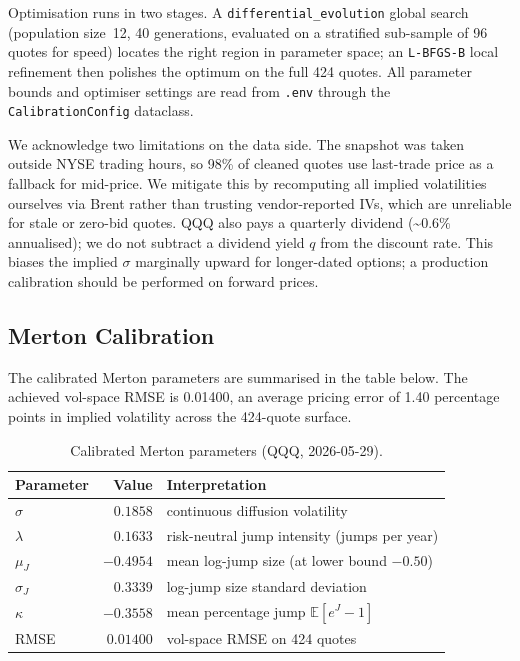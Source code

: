 \documentclass[12pt]{article}
\begin{document}
Optimisation runs in two stages. A \texttt{differential\_evolution}
global search (population size~12, 40 generations, evaluated on a
stratified sub-sample of 96 quotes for speed) locates the right region
in parameter space; an \texttt{L-BFGS-B} local refinement then polishes
the optimum on the full 424 quotes. All parameter bounds and optimiser
settings are read from \texttt{.env} through the
\texttt{CalibrationConfig} dataclass.

We acknowledge two limitations on the data side. The snapshot was taken
outside NYSE trading hours, so 98\% of cleaned quotes use last-trade
price as a fallback for mid-price. We mitigate this by recomputing all
implied volatilities ourselves via Brent rather than trusting
vendor-reported IVs, which are unreliable for stale or zero-bid quotes.
QQQ also pays a quarterly dividend (\textasciitilde$0.6\%$ annualised);
we do not subtract a dividend yield $q$ from the discount rate. This
biases the implied $\sigma$ marginally upward for longer-dated options;
a production calibration should be performed on forward prices.


\subsection*{Merton Calibration}

The calibrated Merton parameters are summarised in the table below.
The achieved vol-space RMSE is 0.01400, an average pricing error of
1.40 percentage points in implied volatility across the 424-quote
surface.

\begin{table}[H]
\centering
\caption{Calibrated Merton parameters (QQQ, 2026-05-29).}
\begin{tabular}{lrl}
\toprule
Parameter      & Value     & Interpretation \\
\midrule
$\sigma$       & $0.1858$  & continuous diffusion volatility \\
$\lambda$      & $0.1633$  & risk-neutral jump intensity (jumps per year) \\
$\mu_J$        & $-0.4954$ & mean log-jump size (at lower bound $-0.50$) \\
$\sigma_J$     & $0.3339$  & log-jump size standard deviation \\
$\kappa$       & $-0.3558$ & mean percentage jump $\mathbb{E}[e^J - 1]$ \\
RMSE           & $0.01400$ & vol-space RMSE on 424 quotes \\
\bottomrule
\end{tabular}
\end{table}
\end{document}
